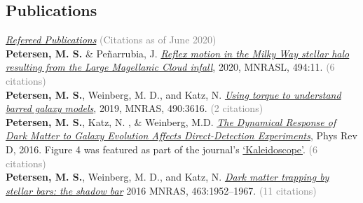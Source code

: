 \documentclass[margin, 11pt]{res} %
\begin{document}
\begin{resume}
\section{\sc \textcolor{redshade}{Publications} }
 \underline{\sl Refereed Publications} \textcolor{grey}{(Citations as of June 2020)} \\
{\bf \textcolor{blueshade}{Petersen, M. S.}} \& Pe{\~n}arrubia, J. \href{https://ui.adsabs.harvard.edu/abs/2020MNRAS.494L..11P/abstract}{\it Reflex motion in the Milky Way stellar halo resulting from the Large Magellanic Cloud infall}, 2020, MNRASL, 494:11. \textcolor{grey}{(6 citations)}\\ %
{\bf \textcolor{blueshade}{Petersen, M. S.}}, Weinberg, M. D., and Katz, N. \href{https://ui.adsabs.harvard.edu/abs/2019MNRAS.490.3616P/abstract}{\it Using torque to understand barred galaxy models}, 2019, MNRAS, 490:3616. \textcolor{grey}{(2 citations)}\\
{\bf \textcolor{blueshade}{Petersen, M. S.}}, Katz, N. , \& Weinberg, M.D. \href{http://adsabs.harvard.edu/abs/2016PhRvD..94l3013P}{{\it The Dynamical Response of Dark Matter to Galaxy Evolution Affects Direct-Detection Experiments}}, Phys Rev D, 2016. Figure 4 was featured as part of the journal's \href{https://journals.aps.org/prd/kaleidoscope/prd/94/12/123013}{`Kaleidoscope'}. \textcolor{grey}{(6 citations)}\\
{\bf \textcolor{blueshade}{Petersen, M. S.}}, Weinberg, M. D., and Katz, N. \href{http://adsabs.harvard.edu/abs/2016MNRAS.463.1952P}{{\it  Dark matter trapping by stellar bars: the shadow bar}} 2016 MNRAS, 463:1952–1967. \textcolor{grey}{(11 citations)}\\


\end{resume}
\end{document}
